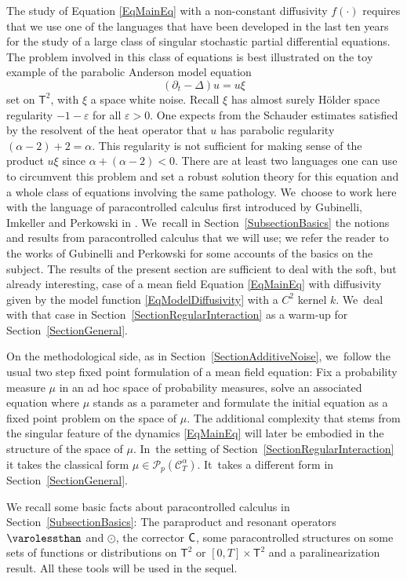 \documentclass[JEP,XML,SOM,Unicode,published]{cedram}
\theoremstyle{definition}
\let\epsilon\varepsilon
\newcommand{\bsfT}{\mathbf{\mathsf{T}}}
\newcommand{\mcP}{\mathcal{P}}
\newcommand{\scrC}{\ensuremath{\mathscr{C}}}
\begin{document}
The study of Equation \eqref{EqMainEq} with a non-constant diffusivity $f(\cdot)$ requires that we use one of the languages that have been developed in the last ten years for the study of a large class of singular stochastic partial differential equations. The problem involved in this class of equations is best illustrated on the toy example of the parabolic Anderson model equation
\[
(\partial_t-\Delta)u = u\xi
\]
set on $\bsfT^2$, with $\xi$ a space white noise. Recall $\xi$ has almost surely Hölder space regularity $-1-\epsilon$ for all $\epsilon>0$. One expects from the Schauder estimates satisfied by the resolvent of the heat operator that $u$ has parabolic regularity $(\alpha-2)+2=\alpha$. This regularity is not sufficient for making sense of the product $u\xi$ since $\alpha + (\alpha-2)<0$. There are at least two languages one can use to circumvent this problem and set a robust solution theory for this equation and a whole class of equations involving the same pathology. We~choose to work here with the language of paracontrolled calculus first introduced by Gubinelli, Imkeller and Perkowski in \cite{GIP}. We~recall in Section~\ref{SubsectionBasics} the notions and results from paracontrolled calculus that we will use; we refer the reader to the works \cite{GPEnsaios, GubinelliPerkowskiRockner, GubinelliICM} of Gubinelli and Perkowski for some accounts of the basics on the subject. The results of the present section are sufficient to deal with the soft, but already interesting, case of a mean field Equation \eqref{EqMainEq} with diffusivity given by the model function \eqref{EqModelDiffusivity} with a $C^2$ kernel $k$. We~deal with that case in Section~\ref{SectionRegularInteraction} as a warm-up for Section~\ref{SectionGeneral}.

On the methodological side, as in Section~\ref{SectionAdditiveNoise}, we~follow the usual two step fixed point formulation of a mean field equation: Fix a probability measure $\mu$ in an ad hoc space of probability measures, solve an associated equation where $\mu$ stands as a parameter and formulate the initial equation as a fixed point problem on the space of $\mu$. The additional complexity that stems from the singular feature of the dynamics \eqref{EqMainEq} will later be embodied in the structure of the space of $\mu$. In~the setting of Section~\ref{SectionRegularInteraction} it takes the classical form $\mu \in \mcP_p(\scrC^\alpha_T)$. It~takes a different form in Section~\ref{SectionGeneral}.

We recall some basic facts about paracontrolled calculus in Section~\ref{SubsectionBasics}: The paraproduct and resonant operators $\varolessthan$ and $\odot$, the corrector $\sf C$, some paracontrolled structures on some sets of functions or distributions on $\mathsf{T}^2$ or $[0,T]\times\mathsf{T}^2$ and a paralinearization result. All these tools will be used in the sequel.
\end{document}

